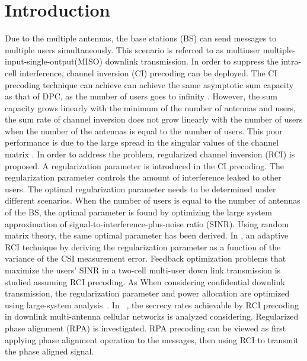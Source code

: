 \documentclass[12pt,journal,draftclsnofoot,onecolumn]{IEEEtran}
\begin{document}
\section{Introduction}
Due to the multiple antennas, the base stations (BS) can send messages to multiple users simultaneously. This scenario is referred to
as multiuser multiple-input-single-output(MISO) downlink transmission. In order to suppress the intra-cell interference, channel inversion (CI) precoding can be deployed. The CI precoding technique can achieve can achieve the same asymptotic sum capacity as that of DPC, as the number of users goes to infinity \cite{yoo2006optimality}. However, the sum capacity grows linearly with the minimum of the number of antennas and users, the sum rate of channel inversion does not grow linearly with the number of users when the number of the antennas is equal to the number of users. This poor performance is due to the large spread
in the singular values of the channel matrix \cite{peel2005vector}. In order to address the problem, regularized channel inversion (RCI) is proposed. A regularization parameter is introduced in the CI precoding. The regularization parameter controls the amount of interference leaked to other users.  The optimal regularization parameter needs to be determined under different scenarios. When the number of users is equal to the number of antennas of the BS,  the optimal parameter is found by optimizing the large system approximation of signal-to-interference-plus-noise ratio (SINR)\cite{peel2005vector}. Using random matrix theory, the same optimal parameter has been derived. In \cite{razavi2016channel}, an adaptive RCI technique by deriving the regularization parameter as
a function of the variance of the CSI measurement error. Feedback   optimization
problems  that  maximize  the  users’  SINR  in  a  two-cell  multi-user down link transmission is studied assuming RCI precoding.  As
When considering confidential downlink transmission, the regularization
parameter and power allocation are optimized using large-system analysis~\cite{geraci2012secrecy}. In ~\cite{geraci2014physical,geraci2013linear,geraci2012secrecy,he2015base,geraci2013large,geraci2014secrecy}, the secrecy rates achievable by
RCI precoding in downlink multi-antenna cellular networks  is analyzed considering. Regularized phase alignment (RPA) \cite{razavi2014transmit,razavi2015adaptively} is investigated. RPA precoding can be viewed as first applying phase alignment operation to the messages, then using RCI to transmit the phase aligned signal.
\end{document}
